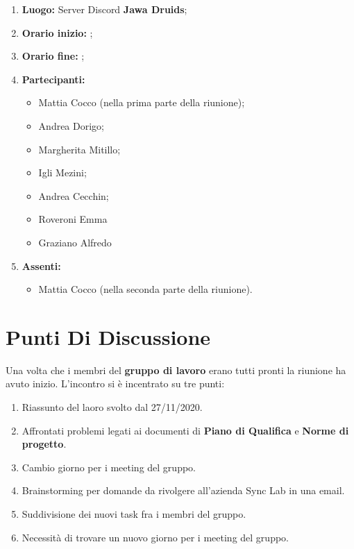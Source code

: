 \documentclass[a4paper,12pt]{report}
\begin{document}
	\makeatother	
	\newpage
	\begin{enumerate}
		\item \textbf{Luogo:} \normalfont Server Discord \textbf{Jawa Druids};
		\item \textbf{Orario inizio:} ;
		\item \textbf{Orario fine:} ;
		\item \textbf{Partecipanti:}
		\begin{itemize}
			\item Mattia Cocco (nella prima parte della riunione); 
			\item Andrea Dorigo;
			\item Margherita Mitillo;
			\item Igli Mezini;
			\item Andrea Cecchin;
			\item Roveroni Emma
			\item Graziano Alfredo
		\end{itemize}
		\item \textbf{Assenti:}
		\begin{itemize}
			\item Mattia Cocco (nella seconda parte della riunione).
		\end{itemize}
	\end{enumerate}
	\newpage
	\tableofcontents{}
	\chapter{Punti Di Discussione}
	Una volta che i membri del \textbf{gruppo di lavoro} erano tutti pronti la riunione ha avuto inizio.
	L'incontro si è incentrato su tre punti:
	\begin{enumerate}
		\item Riassunto del laoro svolto dal 27/11/2020.
		
		\item Affrontati problemi legati ai documenti di \textbf{Piano di Qualifica} e \textbf{Norme di progetto}.
		
		\item Cambio giorno per i meeting del gruppo.
		
		\item Brainstorming per domande da rivolgere all'azienda Sync Lab in una email.
		
		\item Suddivisione dei nuovi task fra i membri del gruppo.
		
		\item Necessità di trovare un nuovo giorno per i meeting del gruppo.
	\end{enumerate}
\end{document}
